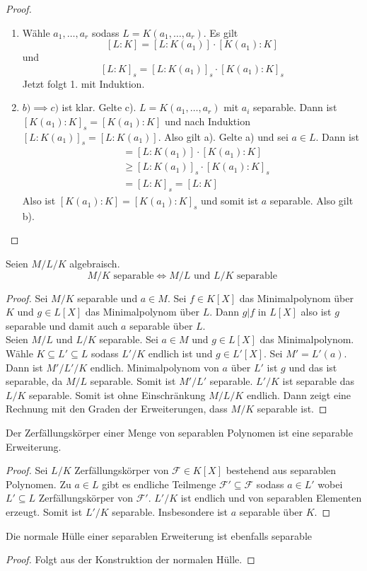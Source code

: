 \begin{proof}
   \begin{enumerate}
       \item  Wähle \(a_1,\dots,a_r\) sodass \(L=K(a_1,\dots,a_r)\). 
    Es gilt \[[L:K]=[L:K(a_1)]\cdot[K(a_1):K]\] und 
    \[[L:K]_s=[L:K(a_1)]_s\cdot [K(a_1):K]_s\]
    Jetzt folgt 1. mit Induktion.
    \item \(b)\implies c)\) ist klar. Gelte c). \(L=K(a_1,\dots,a_r)\) mit \(a_i\) separable.
    Dann ist \([K(a_1):K]_s=[K(a_1):K]\) und nach Induktion \([L:K(a_1)]_s=[L:K(a_1)]\). Also gilt a).
    Gelte a) und sei \(a\in L\). Dann ist 
    \begin{align*}
        [L:K]&=[L:K(a_1)]\cdot[K(a_1):K]\\
        & \geq [L:K(a_1)]_s\cdot[K(a_1):K]_s\\
        &=[L:K]_s=[L:K]
    \end{align*}
    Also ist \([K(a_1):K]=[K(a_1):K]_s\) und somit ist \(a\) separable. Also gilt b).
   \end{enumerate}
\end{proof}
\begin{Kor}
    Seien \(M/L/K\) algebraisch.
    \[M/K \text{ separable}\iff M/L \text{ und } L/K\text{ separable }\]
\end{Kor}
\begin{proof}
    Sei \(M/K\) separable und \(a\in M\). Sei \(f\in K[X]\) das Minimalpolynom über \(K\) und \(g\in L[X]\) das Minimalpolynom über \(L\). Dann \(g|f\) in \(L[X]\) also ist \(g\) separable und damit auch \(a\) separable über \(L\).\\
    Seien \(M/L\) und \(L/K\) separable. Sei \(a\in M\) und \(g\in L[X]\) das Minimalpolynom. Wähle \(K\subseteq L'\subseteq L\) sodass \(L'/K\) endlich ist und \(g\in L'[X]\). Sei \(M'=L'(a)\). Dann ist \(M'/L'/K\) endlich. Minimalpolynom von \(a\) über \(L'\) ist \(g\) und das ist separable, da \(M/L\) separable. Somit ist \(M'/L'\) separable. \(L'/K\) ist separable das \(L/K\) separable.
    Somit ist ohne Einschränkung \(M/L/K\) endlich.
    Dann zeigt eine Rechnung mit den Graden der Erweiterungen, dass \(M/K\) separable ist.
\end{proof}
\begin{Kor}
    Der Zerfällungskörper einer Menge von separablen Polynomen ist eine separable Erweiterung.
\end{Kor}
\begin{proof}
    Sei \(L/K\) Zerfällungskörper von \(\mathcal F\in K[X]\) bestehend aus separablen Polynomen. Zu \(a\in L\) gibt es endliche Teilmenge \(\mathcal F'\subseteq \mathcal F\) sodass \(a\in L'\) wobei \(L'\subseteq L\) Zerfällungskörper von \(\mathcal F'.\) \(L'/K\) ist endlich und von separablen Elementen erzeugt. Somit ist \(L'/K\) separable. Insbesondere ist \(a\) separable über \(K\).
\end{proof}
\begin{Kor}
    Die normale Hülle einer separablen Erweiterung ist ebenfalls separable
\end{Kor}
\begin{proof}
    Folgt aus der Konstruktion der normalen Hülle.
\end{proof}
